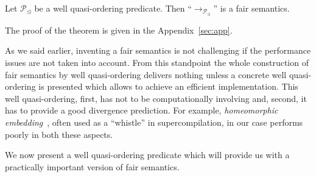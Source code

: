 \begin{theorem}
  \label{thm:main}
  Let $\mathcal{P}_\trianglelefteq$ be a well quasi-ordering predicate. Then ``$\rightarrow_{\mathcal{P}_\trianglelefteq}$'' is a fair semantics.
\end{theorem}

The proof of the theorem is given in the Appendix~\ref{sec:app}.


As we said earlier, inventing a fair semantics is not challenging if the performance issues are not taken into account. From this standpoint the whole
construction of fair semantics by well quasi-ordering delivers nothing unless a concrete well quasi-ordering is presented which allows to achieve an
efficient implementation. This well quasi-ordering, first, has not to be computationally involving and, second, it has to provide a good divergence
prediction. For example, \emph{homeomorphic embedding}~\cite{homemb}, often used as a ``whistle'' in supercompilation, in our case performs poorly in
both these aspects.

We now present a well quasi-ordering predicate which will provide us with a practically important version of fair semantics. 


